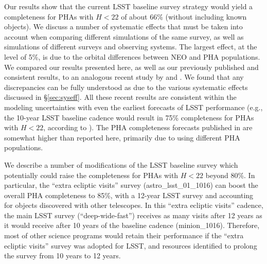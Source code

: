Our results show that the current LSST baseline survey strategy would yield a completeness for PHAs
with $H<22$ of about 66\% (without including known objects). 
We discuss a number of systematic effects that must be taken into
account when comparing different simulations of the same survey, as well as simulations of different
surveys and observing systems. The largest effect, at the level of 5\%, is due to the orbital differences
between NEO and PHA populations. We compared our results presented here, as well as our previously
published and consistent results, to an analogous recent study by \citet[]{GMS2016} and \citet{VeresChesley2017neo}. 
We found that any discrepancies can be fully understood as due to the various systematic effects discussed in
\S\ref{sec:syseff}. All these recent results are consistent within the modeling uncertainties
with even the earliest forecasts of LSST performance (e.g., the 10-year LSST baseline cadence would 
result in 75\% completeness for PHAs with $H<22$, according to \citealt{IvezicNEO2007}). The 
PHA completeness forecasts published in \cite{LSSToverview} are somewhat higher than reported
here, primarily due to using different PHA populations. 

We describe a number of modifications of the LSST baseline survey which potentially could raise the
completeness for PHAs with $H<22$ beyond 80\%. In particular, the ``extra ecliptic visits'' survey
(astro\_lsst\_01\_1016) can boost the overall PHA completeness to 85\%, with a 12-year LSST survey 
and accounting for objects discovered with other telescopes. In this ``extra ecliptic visits'' cadence, 
the main LSST survey (``deep-wide-fast'') receives as many visits after 12 years as it would receive after 10 years of the
baseline cadence (minion\_1016). Therefore, most of other science programs would
retain their performance if the ``extra ecliptic visits'' survey was adopted for
LSST, and resources identified to prolong the survey from 10 years to 12 years. 
